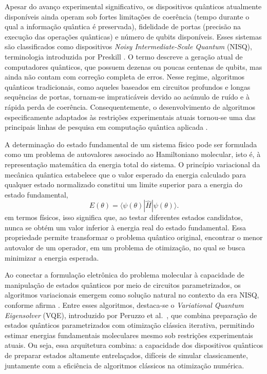Apesar do avanço experimental significativo,
os dispositivos quânticos atualmente disponíveis ainda operam sob
fortes limitações de coerência (tempo durante o qual a informação quântica é preservada),
fidelidade de portas (precisão na execução das operações quânticas)
e número de qubits disponíveis.
Esses sistemas são classificados como dispositivos
\textit{Noisy Intermediate-Scale Quantum} (NISQ),
terminologia introduzida por Preskill
\cite{preskill2018nisq}.
O termo descreve a geração atual de computadores quânticos,
que possuem dezenas ou poucas centenas de qubits,
mas ainda não contam com correção completa de erros.
Nesse regime, algoritmos quânticos tradicionais, como aqueles baseados
em circuitos profundos e longas sequências de portas,
tornam-se impraticáveis devido ao acúmulo de ruído e à rápida perda de coerência.
Consequentemente, o desenvolvimento de algoritmos especificamente
adaptados às restrições experimentais atuais tornou-se uma das principais
linhas de pesquisa em computação quântica aplicada
\cite{bharti2021noisy}.

A determinação do estado fundamental de um sistema físico pode ser
formulada como um problema de autovalores associado ao Hamiltoniano
molecular, isto é, à representação matemática da energia total do sistema.
O princípio variacional da mecânica quântica estabelece que o valor
esperado da energia calculado para qualquer estado normalizado
constitui um limite superior para a energia do estado fundamental,
\begin{equation}
E(\theta)=\langle \psi(\theta)|\hat{H}|\psi(\theta)\rangle.
\end{equation}
em termos físicos, isso significa que,
ao testar diferentes estados candidatos,
nunca se obtém um valor inferior à energia real do estado fundamental.
Essa propriedade permite transformar o problema quântico original,
encontrar o menor autovalor de um operador,
em um problema de otimização,
no qual se busca minimizar a energia esperada.

Ao conectar a formulação eletrônica do problema molecular
à capacidade de manipulação de estados quânticos por meio de
circuitos parametrizados,
os algoritmos variacionais emergem como solução natural
no contexto da era NISQ, conforme afirma \textcite{hidary2019quantum}.
Entre esses algoritmos, destaca-se o
\textit{Variational Quantum Eigensolver} (VQE),
introduzido por Peruzzo et al.~\cite{peruzzo2014variational},
que combina preparação de estados quânticos parametrizados
com otimização clássica iterativa,
permitindo estimar energias fundamentais moleculares
mesmo sob restrições experimentais atuais.
Ou seja, essa arquitetura combina:
a capacidade dos dispositivos quânticos de preparar estados
altamente entrelaçados, difíceis de simular classicamente, juntamente
com a eficiência de algoritmos clássicos na otimização numérica.


